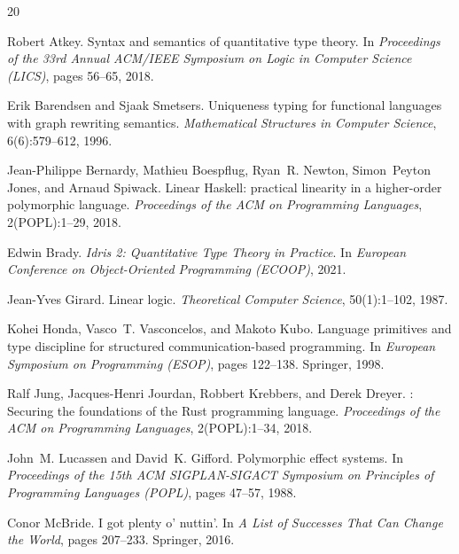 \documentclass[11pt,a4paper]{article}
\begin{document}
\begin{thebibliography}{20}

Robert Atkey.
\newblock Syntax and semantics of quantitative type theory.
\newblock In \emph{Proceedings of the 33rd Annual ACM/IEEE Symposium on Logic in Computer Science (LICS)}, pages 56--65, 2018.

Erik Barendsen and Sjaak Smetsers.
\newblock Uniqueness typing for functional languages with graph rewriting semantics.
\newblock \emph{Mathematical Structures in Computer Science}, 6(6):579--612, 1996.

Jean-Philippe Bernardy, Mathieu Boespflug, Ryan~R. Newton, Simon~Peyton Jones, and Arnaud Spiwack.
\newblock Linear {H}askell: practical linearity in a higher-order polymorphic language.
\newblock \emph{Proceedings of the ACM on Programming Languages}, 2(POPL):1--29, 2018.

Edwin Brady.
\newblock \emph{Idris 2: Quantitative Type Theory in Practice}.
\newblock In \emph{European Conference on Object-Oriented Programming (ECOOP)}, 2021.

Jean-Yves Girard.
\newblock Linear logic.
\newblock \emph{Theoretical Computer Science}, 50(1):1--102, 1987.

Kohei Honda, Vasco~T. Vasconcelos, and Makoto Kubo.
\newblock Language primitives and type discipline for structured communication-based programming.
\newblock In \emph{European Symposium on Programming (ESOP)}, pages 122--138. Springer, 1998.

Ralf Jung, Jacques-Henri Jourdan, Robbert Krebbers, and Derek Dreyer.
: Securing the foundations of the {Rust} programming language.
\newblock \emph{Proceedings of the ACM on Programming Languages}, 2(POPL):1--34, 2018.

John~M. Lucassen and David~K. Gifford.
\newblock Polymorphic effect systems.
\newblock In \emph{Proceedings of the 15th ACM SIGPLAN-SIGACT Symposium on Principles of Programming Languages (POPL)}, pages 47--57, 1988.

Conor McBride.
\newblock I got plenty o' nuttin'.
\newblock In \emph{A List of Successes That Can Change the World}, pages 207--233. Springer, 2016.


\end{thebibliography}
\end{document}
